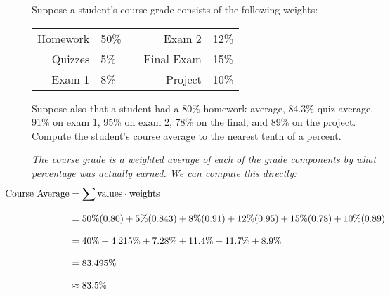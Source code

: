 \documentclass[12pt,letterpaper]{exam}
\begin{document}
\begin{questions}
\newpage
\question[10] Suppose a student's course grade consists of the following weights: \par
	\begin{table}[!ht]
	\centering
	\begin{tabular}{rlcrl}
	Homework & 50\% & & Exam 2 & 12\% \\
	Quizzes & 5\% & & Final Exam & 15\% \\
	Exam 1 & 8\% & & Project & 10\% \\
	\end{tabular}
	\end{table} \par
Suppose also that a student had a 80\% homework average, 84.3\% quiz average, 91\% on exam 1, 95\% on exam 2, 78\% on the final, and 89\% on the project. Compute the student's course average to the nearest tenth of a percent. \pspace

{\itshape 
\sol The course grade is a weighted average of each of the grade components by what percentage was actually earned. We can compute this directly: 
	\[
	\begin{aligned}
	\hspace{-1cm}\text{Course Average}&= \sum \text{values} \cdot \text{weights} \\[0.3cm]
	&= 50\% (0.80) + 5\% (0.843) + 8\% (0.91) + 12\% (0.95) + 15\% (0.78) + 10\% (0.89) \\[0.3cm]
	&= 40\% + 4.215\% + 7.28\% + 11.4\% + 11.7\% + 8.9\% \\[0.3cm]
	&= 83.495\% \\[0.3cm]
	&\approx 83.5\%
	\end{aligned}
	\] 
}




\end{questions}
\end{document}
